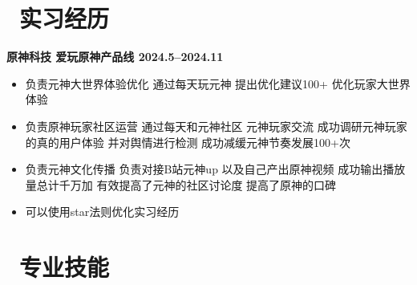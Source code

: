 \documentclass[11pt]{article}
\begin{document}
\section{\makebox[\widthof{\faGraduationCap}][c]{\color{CVBlue}\faUsers}\ 实习经历}
\textbf{原神科技            \hfill 爱玩原神产品线 2024.5--2024.11    }
\begin{itemize}
    \item 负责元神大世界体验优化   通过每天玩元神   提出优化建议100+  优化玩家大世界体验
	\item 负责原神玩家社区运营   通过每天和元神社区  元神玩家交流  成功调研元神玩家的真的用户体验  并对舆情进行检测  成功减缓元神节奏发展100+次
    \item 负责元神文化传播   负责对接B站元神up 以及自己产出原神视频    成功输出播放量总计千万加  有效提高了元神的社区讨论度  提高了原神的口碑
    \item 可以使用star法则优化实习经历

\end{itemize}





\section{\makebox[\widthof{\faGraduationCap}][c]{\color{CVBlue}\faWrench}\ 专业技能}
\end{document}
